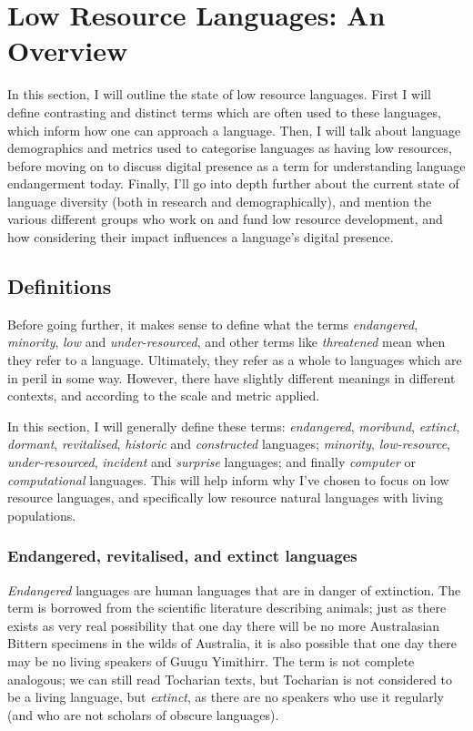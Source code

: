 \section{Low Resource Languages: An Overview}\label{sec:endlang}

In this section, I will outline the state of low resource languages. First I will define contrasting and distinct terms which are often used to these languages, which inform how one can approach a language. Then, I will talk about language demographics and metrics used to categorise languages as having low resources, before moving on to discuss digital presence as a term for understanding language endangerment today. Finally, I'll go into depth further about the current state of language diversity (both in research and demographically), and mention the various different groups who work on and fund low resource development, and how considering their impact influences a language's digital presence.

\subsection{Definitions}

Before going further, it makes sense to define what the terms \emph{endangered}, \emph{minority}, \emph{low} and \emph{under-resourced}, and other terms like \emph{threatened} mean when they refer to a language. Ultimately, they refer as a whole to languages which are in peril in some way. However, there have slightly different meanings in different contexts, and according to the scale and metric applied.

In this section, I will generally define these terms: {\it endangered}, {\it moribund},  {\it extinct}, {\it dormant}, {\it revitalised}, {\it historic} and  {\it constructed} languages; {\it minority}, {\it low-resource}, {\it under-resourced}, {\it incident} and {\it surprise} languages; and finally {\it computer} or {\it computational} languages. This will help inform why I've chosen to focus on low resource languages, and specifically low resource natural languages with living populations.

\subsubsection{Endangered, revitalised, and extinct languages}

\emph{Endangered} languages are human languages that are in danger of extinction. The term is borrowed from the scientific literature describing animals; just as there exists as very real possibility that one day there will be no more Australasian Bittern specimens in the wilds of Australia, it is also possible that one day there may be no living speakers of Guugu Yimithirr. The term is not complete analogous; we can still read Tocharian texts, but Tocharian is not considered to be a living language, but {\it extinct}, as there are no speakers who use it regularly (and who are not scholars of obscure languages).

